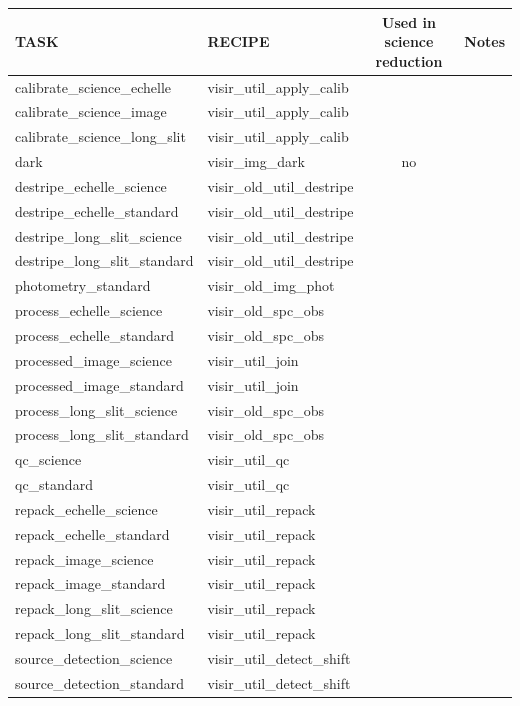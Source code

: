\begin{table}[htbp]
\centering
\scriptsize
\begin{tabular}{|l|l|c|c|}
\hline
\textbf{TASK} & \textbf{RECIPE} & \textbf{Used in science reduction} & \textbf{Notes} \\
\hline 
calibrate\_science\_echelle & visir\_util\_apply\_calib & & \\
calibrate\_science\_image & visir\_util\_apply\_calib & & \\
calibrate\_science\_long\_slit & visir\_util\_apply\_calib & & \\
dark & visir\_img\_dark & no &  \\
destripe\_echelle\_science & visir\_old\_util\_destripe & & \\
destripe\_echelle\_standard & visir\_old\_util\_destripe & & \\
destripe\_long\_slit\_science & visir\_old\_util\_destripe & & \\
destripe\_long\_slit\_standard & visir\_old\_util\_destripe & & \\
photometry\_standard & visir\_old\_img\_phot & & \\
process\_echelle\_science & visir\_old\_spc\_obs & & \\
process\_echelle\_standard & visir\_old\_spc\_obs & & \\
processed\_image\_science & visir\_util\_join & & \\
processed\_image\_standard & visir\_util\_join & & \\
process\_long\_slit\_science & visir\_old\_spc\_obs & & \\
process\_long\_slit\_standard & visir\_old\_spc\_obs & & \\
qc\_science & visir\_util\_qc & & \\
qc\_standard & visir\_util\_qc & & \\
repack\_echelle\_science & visir\_util\_repack & & \\
repack\_echelle\_standard & visir\_util\_repack & & \\
repack\_image\_science & visir\_util\_repack & & \\
repack\_image\_standard & visir\_util\_repack & & \\
repack\_long\_slit\_science & visir\_util\_repack & & \\
repack\_long\_slit\_standard & visir\_util\_repack & & \\
source\_detection\_science & visir\_util\_detect\_shift & & \\
source\_detection\_standard & visir\_util\_detect\_shift & & \\

\end{tabular}
\end{table}
